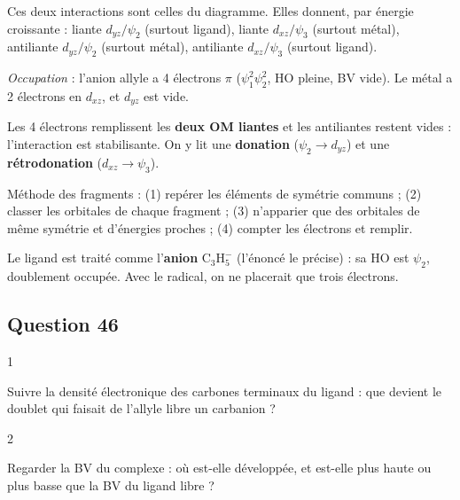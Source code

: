 \documentclass[11pt,a4paper]{article}
\newcommand{\equationajustee}[1]{%
  \sbox{\boiteequation}{$\displaystyle #1$}%
  \ifdim\wd\boiteequation>\linewidth
    \[\resizebox{\linewidth}{!}{\usebox{\boiteequation}}\]%
  \else
    \[#1\]%
  \fi}
\begin{document}
\equationajustee{\boxed{\psi_2\ (\mathrm{HO})\leftrightarrow d_{yz},\qquad \psi_3\ (\mathrm{BV})\leftrightarrow d_{xz}}}

Ces deux interactions sont celles du diagramme. Elles donnent, par énergie croissante : liante \(d_{yz}/\psi_2\) (surtout ligand), liante \(d_{xz}/\psi_3\) (surtout métal), antiliante \(d_{yz}/\psi_2\) (surtout métal), antiliante \(d_{xz}/\psi_3\) (surtout ligand).

\emph{Occupation} : l'anion allyle a 4 électrons \(\pi\) (\(\psi_1^2\psi_2^2\), HO pleine, BV vide). Le métal a 2 électrons en \(d_{xz}\), et \(d_{yz}\) est vide.

Les 4 électrons remplissent les \textbf{deux OM liantes} et les antiliantes restent vides : l'interaction est stabilisante. On y lit une \textbf{donation} (\(\psi_2\to d_{yz}\)) et une \textbf{rétrodonation} (\(d_{xz}\to\psi_3\)).

\begin{methode}

Méthode des fragments : (1) repérer les éléments de symétrie communs ; (2) classer les orbitales de chaque fragment ; (3) n'apparier que des orbitales de même symétrie et d'énergies proches ; (4) compter les électrons et remplir.

\end{methode}

\begin{piege}

Le ligand est traité comme l'\textbf{anion} \(\mathrm{C_3H_5^-}\) (l'énoncé le précise) : sa HO est \(\psi_2\), doublement occupée. Avec le radical, on ne placerait que trois électrons.

\end{piege}

\hypertarget{question-46}{%
\subsection{Question 46}\label{question-46}}

\begin{indication}{1}

Suivre la densité électronique des carbones terminaux du ligand : que devient le doublet qui faisait de l'allyle libre un carbanion ?

\end{indication}

\begin{indication}{2}

Regarder la BV du complexe : où est-elle développée, et est-elle plus haute ou plus basse que la BV du ligand libre ?

\end{indication}
\end{document}
